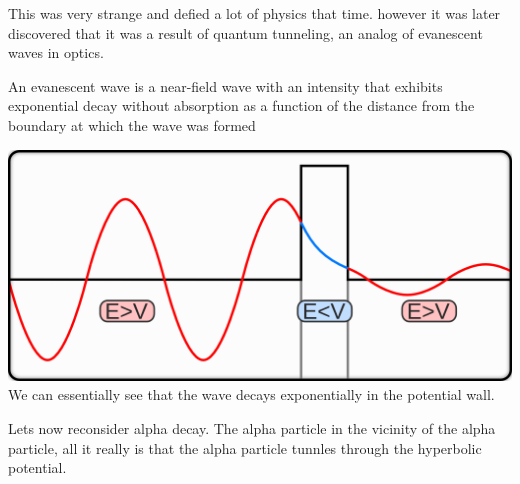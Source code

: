 \documentclass[english, 11pt]{article}
\begin{document}
        This was very strange and defied a lot of physics that time. however it was later discovered that it was a result of quantum tunneling, an analog of evanescent waves in optics. 

        \begin{defn}
          An evanescent wave is a near-field wave with an intensity that exhibits exponential decay without absorption as a function of the distance from the boundary at which the wave was formed
        \end{defn}

         

      \begin{center}
         \includegraphics[scale=0.7]{../img/qwave}\\
         We can essentially see that the wave decays exponentially in the potential wall.
      \end{center}

      Lets now reconsider alpha decay. The alpha particle in the vicinity of the alpha particle, all it really is that the alpha particle tunnles through the hyperbolic potential.





  
\end{document}
